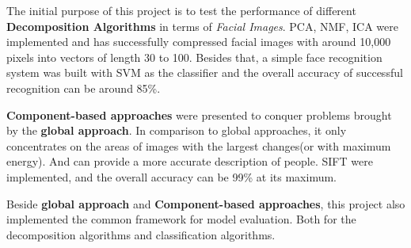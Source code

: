 \begin{englishabstract}

The initial purpose of this project is to test the performance of different \textbf{Decomposition Algorithms} in terms of \textit{Facial Images}. PCA, NMF, ICA were implemented and has successfully compressed facial images with around 10,000 pixels into vectors of length 30 to 100. Besides that, a simple face recognition system was built with SVM as the classifier and the overall accuracy of successful recognition can be around 85\%. \newline

\textbf{Component-based approaches} were presented to conquer problems brought by the \textbf{global approach}. In comparison to global 
approaches, it only concentrates on the areas of images with the largest changes(or with maximum energy). And can provide a more accurate description of people. SIFT were implemented, and the overall accuracy can be 99\% at its maximum. \newline

Beside \textbf{global approach} and \textbf{Component-based approaches}, this project also implemented the common framework for model evaluation. Both for the decomposition algorithms and classification algorithms.


\end{englishabstract}
